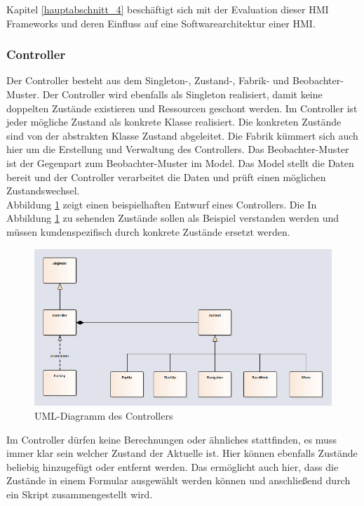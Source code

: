Kapitel \ref{hauptabschnitt_4} beschäftigt sich mit der Evaluation dieser \ac{HMI} Frameworks und deren Einfluss auf eine Softwarearchitektur einer \ac{HMI}.\\

\subsubsection{Controller}
Der Controller besteht aus dem Singleton-, Zustand-, Fabrik- und Beobachter-Muster. Der Controller wird ebenfalls als Singleton realisiert, damit keine doppelten Zustände existieren und Ressourcen geschont werden. Im Controller ist jeder mögliche Zustand als konkrete Klasse realisiert. Die konkreten Zustände sind von der abstrakten Klasse Zustand abgeleitet. Die Fabrik kümmert sich auch hier um die Erstellung und Verwaltung des Controllers. Das Beobachter-Muster ist der Gegenpart zum Beobachter-Muster im Model. Das Model stellt die Daten bereit und der Controller verarbeitet die Daten und prüft einen möglichen Zustandswechsel. \\

Abbildung \ref{fig:controller_diagram} zeigt einen beispielhaften Entwurf eines Controllers. Die In Abbildung \ref{fig:controller_diagram} zu sehenden Zustände sollen als Beispiel verstanden werden und müssen kundenspezifisch durch konkrete Zustände ersetzt werden.\\

\begin{figure}[htb]
	\centering
	\includegraphics[width=\textwidth]{img/3_entwicklung_neues_kontept/controller_diagram}
	\caption{UML-Diagramm des Controllers}
	\label{fig:controller_diagram}
\end{figure}

Im Controller dürfen keine Berechnungen oder ähnliches stattfinden, es muss immer klar sein welcher Zustand der Aktuelle ist. Hier können ebenfalls Zustände beliebig hinzugefügt oder entfernt werden. Das ermöglicht auch hier, dass die Zustände in einem Formular ausgewählt werden können und anschließend durch ein Skript zusammengestellt wird.\\




